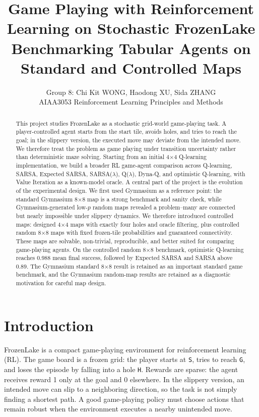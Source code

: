 \documentclass[10pt]{article}
\title{\vspace{-1.2em}\textbf{Game Playing with Reinforcement Learning on Stochastic FrozenLake}\\[-0.25em]
{\large Benchmarking Tabular Agents on Standard and Controlled Maps}}
\author{Group 8: Chi Kit WONG, Haodong XU, Sida ZHANG\\
AIAA3053 Reinforcement Learning Principles and Methods}
\date{}
\begin{document}
\maketitle
\vspace{-1.8em}

\begin{abstract}
This project studies FrozenLake as a stochastic grid-world game-playing task. A player-controlled agent starts from the start tile, avoids holes, and tries to reach the goal; in the slippery version, the executed move may deviate from the intended move. We therefore treat the problem as game playing under transition uncertainty rather than deterministic maze solving. Starting from an initial 4$\times$4 Q-learning implementation, we build a broader RL game-agent comparison across Q-learning, SARSA, Expected SARSA, SARSA($\lambda$), Q($\lambda$), Dyna-Q, and optimistic Q-learning, with Value Iteration as a known-model oracle. A central part of the project is the evolution of the experimental design. We first used Gymnasium as a reference point: the standard Gymnasium 8$\times$8 map is a strong benchmark and sanity check, while Gymnasium-generated low-$p$ random maps revealed a problem--many are connected but nearly impossible under slippery dynamics. We therefore introduced controlled maps: designed 4$\times$4 maps with exactly four holes and oracle filtering, plus controlled random 8$\times$8 maps with fixed frozen-tile probabilities and guaranteed connectivity. These maps are solvable, non-trivial, reproducible, and better suited for comparing game-playing agents. On the controlled random 8$\times$8 benchmark, optimistic Q-learning reaches 0.988 mean final success, followed by Expected SARSA and SARSA above 0.89. The Gymnasium standard 8$\times$8 result is retained as an important standard game benchmark, and the Gymnasium random-map results are retained as a diagnostic motivation for careful map design.
\end{abstract}

\section{Introduction}
FrozenLake is a compact game-playing environment for reinforcement learning (RL). The game board is a frozen grid: the player starts at \texttt{S}, tries to reach \texttt{G}, and loses the episode by falling into a hole \texttt{H}. Rewards are sparse: the agent receives reward 1 only at the goal and 0 elsewhere. In the slippery version, an intended move can slip to a neighboring direction, so the task is not simply finding a shortest path. A good game-playing policy must choose actions that remain robust when the environment executes a nearby unintended move.
\end{document}
